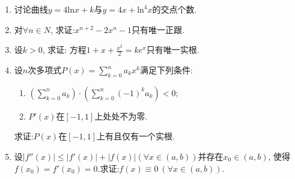 \begin{enumerate}
\begin{enumerate}
\end{enumerate}
\item 讨论曲线$y=4\mathrm{ln}x+k$与$y=4x+\mathrm{ln}^4x$的交点个数.
\item 对$\forall n\in N$, 求证:$x^{n+2}-2x^n-1$只有唯一正跟.
\item 设$k>0$, 求证: 方程$1+x+\frac{x^2}{2}=ke^x$只有唯一实根.
\item 设$n$次多项式$P(x)=\sum_{k=0}^{n}a_kx^k$满足下列条件:
\begin{enumerate}
	\item $(\sum_{k=0}^{n}a_k)\cdot (\sum_{k=0}^{n}(-1)^ka_k)<0$;
	\item $P'(x)$在$[-1,1]$上处处不为零.

\end{enumerate}
求证:$P(x)$在$[-1,1]$上有且仅有一个实根.
\item 设$|f''(x)|\le |f'(x)|+|f(x)|(\forall x\in (a,b))$并存在$x_0\in(a,b)$, 使得$f(x_0)=f'(x_0)=0$.求证:$f(x)\equiv 0\ (\forall x \in (a,b))$.
\end{enumerate}
